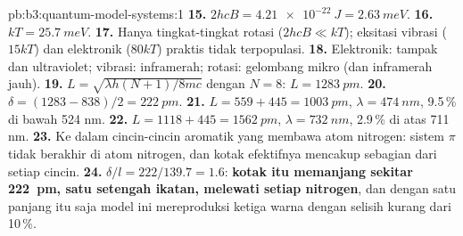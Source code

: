 \begin{solution}{pb:b3:quantum-model-systems:1}
\textbf{15.} $2hcB = \qty{4.21e-22}{J} = \qty{2.63}{meV}$.
\textbf{16.} $kT = \qty{25.7}{meV}$.
\textbf{17.} Hanya tingkat-tingkat rotasi ($2hcB \ll kT$); eksitasi vibrasi
($15kT$) dan elektronik ($80kT$) praktis tidak terpopulasi.
\textbf{18.} Elektronik: tampak dan ultraviolet; vibrasi: inframerah;
rotasi: gelombang mikro (dan inframerah jauh).
\textbf{19.} $L = \sqrt{\lambda h(N+1)/8mc}$ dengan $N = 8$: $L = \qty{1283}{pm}$.
\textbf{20.} $\delta = (1283 - 838)/2 = \qty{222}{pm}$.
\textbf{21.} $L = 559 + 445 = \qty{1003}{pm}$, $\lambda = \qty{474}{nm}$, 9.5\,\%
di bawah 524 nm.
\textbf{22.} $L = 1118 + 445 = \qty{1562}{pm}$, $\lambda = \qty{732}{nm}$, 2.9\,\%
di atas 711 nm.
\textbf{23.} Ke dalam cincin-cincin aromatik yang membawa atom nitrogen:
sistem $\pi$ tidak berakhir di atom nitrogen, dan kotak efektifnya mencakup
sebagian dari setiap cincin.
\textbf{24.} $\delta/l = 222/139.7 = 1.6$: \textbf{kotak itu memanjang sekitar
\qty{222}{pm}, satu setengah ikatan, melewati setiap nitrogen}, dan dengan
satu panjang itu saja model ini mereproduksi ketiga warna dengan selisih
kurang dari 10\,\%.
\end{solution}
